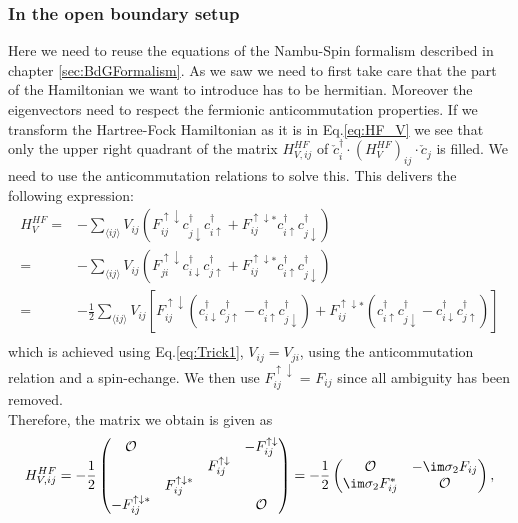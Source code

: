 \documentclass[../main.tex]{subfile}
\begin{document}
\subsubsection{In the open boundary setup}
Here we need to reuse the equations of the Nambu-Spin formalism described in chapter \ref{sec:BdGFormalism}. As we saw we need to first
take care that the part of the Hamiltonian we want to introduce has to be hermitian. Moreover the eigenvectors need to respect the fermionic
anticommutation properties.
If we transform the Hartree-Fock Hamiltonian as it is in Eq.\ref{eq:HF_V} we see that only the upper right quadrant of the matrix $H_{V,ij}^{HF}$ 
of $\check{c}_i^{\dagger} \cdot (H_{V}^{HF})_{ij}\cdot \check{c}_j $ is filled. We need to use the anticommutation relations to solve this.
This delivers the following expression:
\begin{equation}
    \begin{aligned}
    H_V^{HF} =& -\sum_{\langle ij\rangle} V_{ij} \left(F_{ij}^{\uparrow \downarrow} c_{j\downarrow}^{\dagger}c_{i\uparrow}^{\dagger} +
     F_{ij}^{\uparrow \downarrow\ast} c_{i\uparrow}^{\dagger}c_{j\downarrow}^{\dagger}\right)\\
     =& -\sum_{\langle ij\rangle} V_{ij} \left(F_{ji}^{\uparrow \downarrow} c_{i\downarrow}^{\dagger}c_{j\uparrow}^{\dagger} +
     F_{ij}^{\uparrow \downarrow\ast} c_{i\uparrow}^{\dagger}c_{j\downarrow}^{\dagger}\right)\\
     =& -\frac{1}{2}\sum_{\langle ij\rangle} V_{ij} \left[F_{ij}^{\uparrow \downarrow} \left(c_{i\downarrow}^{\dagger}c_{j\uparrow}^{\dagger} - c_{i\uparrow}^{\dagger}c_{j\downarrow}^{\dagger}\right)
     + F_{ij}^{\uparrow \downarrow\ast}  \left(c_{i\uparrow}^{\dagger}c_{j\downarrow}^{\dagger} - c_{i\downarrow}^{\dagger}c_{j\uparrow}^{\dagger}\right)\right]\\
    \end{aligned}
\end{equation} 
which is achieved using Eq.\ref{eq:Trick1}, $V_{ij} = {V_{ji}}$, 
using the anticommutation relation and a spin-echange. We then use $F_{ij}^{\uparrow \downarrow}$ = $F_{ij}$ since all ambiguity has been removed.\\
Therefore, the matrix we obtain is given as
\begin{equation}\label{eq:H_V_DWave}
    H_{V,ij}^{HF} = -\frac{1}{2}\begin{pmatrix}
        \mathcal{O} & & & -F_{ij}^{\uparrow \downarrow}\\
         & & F_{ij}^{\uparrow \downarrow} & \\
         & F_{ij}^{\uparrow \downarrow\ast}& & \\
         -F_{ij}^{\uparrow \downarrow\ast} & & & \mathcal{O}\\
    \end{pmatrix} = -\frac{1}{2}\begin{pmatrix}
        \mathcal{O} & -\im \sigma_2 F_{ij}\\
        \im \sigma_2 F_{ij}^{\ast} & \mathcal{O}
    \end{pmatrix},
\end{equation}
\end{document}
